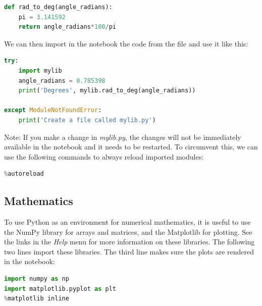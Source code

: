 \documentclass[a4paper , 12pt]{book}
\begin{document}
\begin{center}
\begin{lstlisting}[language=Python, frame=single]
def rad_to_deg(angle_radians):
    pi = 3.141592
    return angle_radians*180/pi
\end{lstlisting}
\end{center}

We can then import in the notebook the code from the file and use it like this:

\begin{center}
\begin{lstlisting}[language=Python, frame=single]
try:
    import mylib
    angle_radians = 0.785398
    print('Degrees', mylib.rad_to_deg(angle_radians))
    
except ModuleNotFoundError:
    print('Create a file called mylib.py')
\end{lstlisting}
\end{center}

Note: If you make a change in \textit{mylib.py}, the changes will not be immediately available in the notebook and it needs to be restarted. To circumvent this, we can use the following commands to always reload imported modules:

\begin{center}
\begin{lstlisting}[language=Python, frame=single]
%load_ext autoreload
%autoreload
\end{lstlisting}   
\end{center}

\subsection{Mathematics}

To use Python as an environment for numerical mathematics, it is useful to use the NumPy library for arrays and matrices, and the Matplotlib for plotting. See the links in the \textit{Help} menu for more information on these libraries. The following two lines import these libraries. The third line makes sure the plots are rendered in the notebook:

\begin{center}
\begin{lstlisting}[language=Python, frame=single]
import numpy as np
import matplotlib.pyplot as plt
%matplotlib inline
\end{lstlisting}
\end{center}
\end{document}

